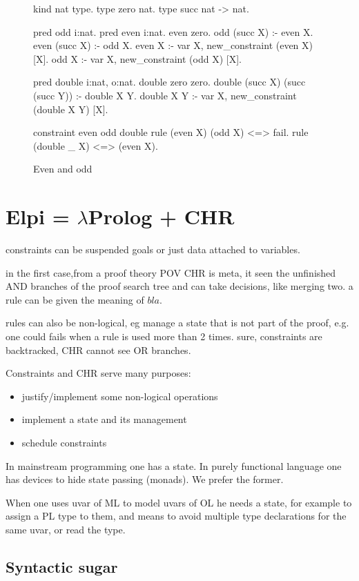 \documentclass[a4paper, 11pt]{book}
\begin{document}
\begin{figure}
\begin{elpicode}
kind nat type.
type zero nat.
type succ nat -> nat.

pred odd i:nat.
pred even i:nat.
even zero.
odd (succ X) :- even X.
even (succ X) :- odd X.
even X :- var X, new_constraint (even X) [X].
odd X :- var X, new_constraint (odd X) [X].

pred double i:nat, o:nat.
double zero zero.
double (succ X) (succ (succ Y)) :- double X Y.
double X Y :- var X, new_constraint (double X Y) [X].

constraint even odd double {
  rule (even X) (odd X) <=> fail.
  rule (double _ X) <=> (even X).
}
\end{elpicode}
\caption[even odd]{Even and odd}
\end{figure}

\section{Elpi = $\lambda$Prolog + CHR}

constraints can be suspended goals or just data attached to variables.

in the first case,from a proof theory POV CHR is meta, it seen the unfinished AND
branches of the proof search tree and can take decisions, like merging two. a rule can
be given the meaning of $bla$. 

rules can also be non-logical, eg manage a state that is not part of 
the proof, e.g. one could fails when a rule is used more than 2 times.
sure, constraints are backtracked, CHR cannot see OR branches.

 
Constraints and CHR serve many purposes:
\begin{itemize}
  \item justify/implement some non-logical operations
  \item implement a state and its management
  \item schedule constraints
\end{itemize}

In mainstream programming one has a state. In purely functional language
one has devices to hide state passing (monads). We prefer the former.

When one uses uvar of ML to model uvars of OL he needs a state, for example
to assign a PL type to them, and means to avoid multiple type declarations for the same
uvar, or read the type.


\subsection{Syntactic sugar}
\end{document}
